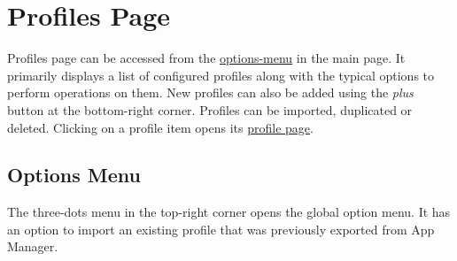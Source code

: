 \section{Profiles Page}\label{sec:profiles-page} %
Profiles page can be accessed from the \hyperref[subsec:main-page-options-menu]{options-menu} in the
main page. It primarily displays a list of configured profiles along with the typical options to
perform operations on them. New profiles can also be added using the \textit{plus} button at the
bottom-right corner. Profiles can be imported, duplicated or deleted. Clicking on a profile item
opens its \hyperref[sec:profile-page]{profile page}.

\subsection{Options Menu}\label{subsec:profiles-options-menu} %
The three-dots menu in the top-right corner opens the global option menu. It has an option to import
an existing profile that was previously exported from App Manager.

